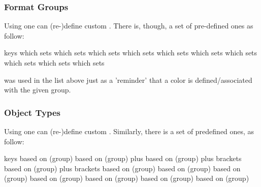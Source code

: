 \documentclass{article}
\begin{document}
\subsubsection{Format Groups}
Using  one can (re-)define custom . There is, though, a set of pre-defined  ones as follow:

\begin{describelist*}{keys}
   {which sets }
   {which sets }
   {which sets }
   {which sets }
   {which sets }
   {which sets }
   {which sets }
   {which sets }
    {which sets }
    {which sets }
\end{describelist*}
\begin{tsremark}
 was used in the list above just as a 'reminder' that a color is defined/associated with the given group.
\end{tsremark}

\subsubsection{Object Types}\label{obj-types}
Using  one can (re-)define custom .
Similarly, there is a set of predefined ones, as follow:

\begin{describelist*}{keys}
   {based on (group) }
   {based on (group)  plus }
   {based on (group)  plus brackets}
   {based on (group)  plus brackets}
   {based on (group) }
   {based on (group) }
   {based on (group) }
   {based on (group) }
   {based on (group) }
    {based on (group) }
    {based on (group) }
\end{describelist*}
\end{document}
